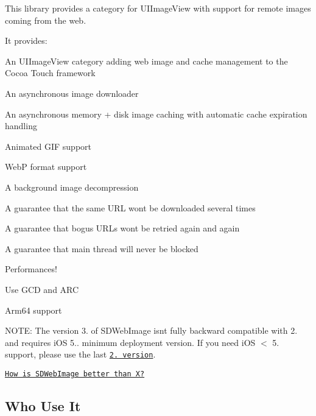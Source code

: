 \href{https://travis-ci.org/rs/SDWebImage}{\tt } \href{http://cocoadocs.org/docsets/SDWebImage/}{\tt } \href{http://cocoadocs.org/docsets/SDWebImage/}{\tt } \href{https://www.apache.org/licenses/LICENSE-2.0.html}{\tt } \href{https://www.versioneye.com/objective-c/sdwebimage/3.3}{\tt } \href{https://www.versioneye.com/objective-c/sdwebimage/references}{\tt } \href{https://github.com/rs/SDWebImage}{\tt }

This library provides a category for U\+I\+Image\+View with support for remote images coming from the web.

It provides\+:


\begin{DoxyItemize}
\item An {\ttfamily U\+I\+Image\+View} category adding web image and cache management to the Cocoa Touch framework
\item An asynchronous image downloader
\item An asynchronous memory + disk image caching with automatic cache expiration handling
\item Animated G\+IF support
\item WebP format support
\item A background image decompression
\item A guarantee that the same U\+RL won\textquotesingle{}t be downloaded several times
\item A guarantee that bogus U\+R\+Ls won\textquotesingle{}t be retried again and again
\item A guarantee that main thread will never be blocked
\item Performances!
\item Use G\+CD and A\+RC
\item Arm64 support
\end{DoxyItemize}

N\+O\+TE\+: The version 3. of S\+D\+Web\+Image isn\textquotesingle{}t fully backward compatible with 2. and requires i\+OS 5.. minimum deployment version. If you need i\+OS $<$ 5. support, please use the last \href{https://github.com/rs/SDWebImage/tree/2.0-compat}{\tt 2. version}.

\href{https://github.com/rs/SDWebImage/wiki/How-is-SDWebImage-better-than-X%3F}{\tt How is S\+D\+Web\+Image better than X?}

\subsection*{Who Use It }

